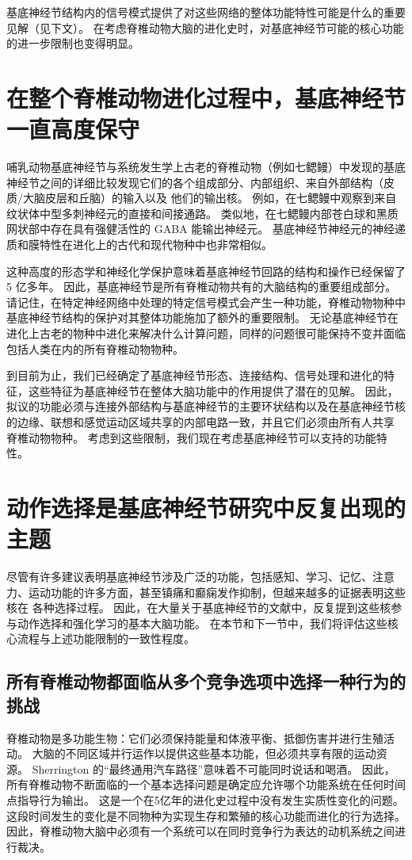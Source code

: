 基底神经节结构内的信号模式提供了对这些网络的整体功能特性可能是什么的重要见解（见下文）。 在考虑脊椎动物大脑的进化史时，对基底神经节可能的核心功能的进一步限制也变得明显。


\section{在整个脊椎动物进化过程中，基底神经节一直高度保守}

哺乳动物基底神经节与系统发生学上古老的脊椎动物（例如七鳃鳗）中发现的基底神经节之间的详细比较发现它们的各个组成部分、内部组织、来自外部结构（皮质/大脑皮层和丘脑）的输入以及 他们的输出核。 例如，在七鳃鳗中观察到来自纹状体中型多刺神经元的直接和间接通路。 类似地，在七鳃鳗内部苍白球和黑质网状部中存在具有强健活性的 GABA 能输出神经元。 基底神经节神经元的神经递质和膜特性在进化上的古代和现代物种中也非常相似。

这种高度的形态学和神经化学保护意味着基底神经节回路的结构和操作已经保留了 5 亿多年。 因此，基底神经节是所有脊椎动物共有的大脑结构的重要组成部分。 请记住，在特定神经网络中处理的特定信号模式会产生一种功能，脊椎动物物种中基底神经节结构的保护对其整体功能施加了额外的重要限制。 无论基底神经节在进化上古老的物种中进化来解决什么计算问题，同样的问题很可能保持不变并面临包括人类在内的所有脊椎动物物种。

到目前为止，我们已经确定了基底神经节形态、连接结构、信号处理和进化的特征，这些特征为基底神经节在整体大脑功能中的作用提供了潜在的见解。 因此，拟议的功能必须与连接外部结构与基底神经节的主要环状结构以及在基底神经节核的边缘、联想和感觉运动区域共享的内部电路一致，并且它们必须由所有人共享 脊椎动物物种。 考虑到这些限制，我们现在考虑基底神经节可以支持的功能特性。

\section{动作选择是基底神经节研究中反复出现的主题}
尽管有许多建议表明基底神经节涉及广泛的功能，包括感知、学习、记忆、注意力、运动功能的许多方面，甚至镇痛和癫痫发作抑制，但越来越多的证据表明这些核在 各种选择过程。 因此，在大量关于基底神经节的文献中，反复提到这些核参与动作选择和强化学习的基本大脑功能。 在本节和下一节中，我们将评估这些核心流程与上述功能限制的一致性程度。

\subsection{所有脊椎动物都面临从多个竞争选项中选择一种行为的挑战}
脊椎动物是多功能生物：它们必须保持能量和体液平衡、抵御伤害并进行生殖活动。 大脑的不同区域并行运作以提供这些基本功能，但必须共享有限的运动资源。 Sherrington 的“最终通用汽车路径”意味着不可能同时说话和喝酒。 因此，所有脊椎动物不断面临的一个基本选择问题是确定应允许哪个功能系统在任何时间点指导行为输出。 这是一个在5亿年的进化史过程中没有发生实质性变化的问题。 这段时间发生的变化是不同物种为实现生存和繁殖的核心功能而进化的行为选择。 因此，脊椎动物大脑中必须有一个系统可以在同时竞争行为表达的动机系统之间进行裁决。

